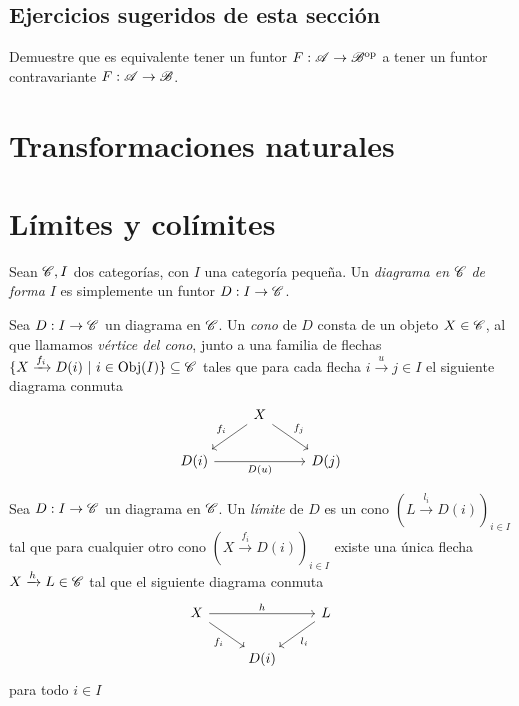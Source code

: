 \documentclass{comunicaciones}
\begin{document}
\subsection{Ejercicios sugeridos de esta sección}

\begin{ex}
    Demuestre que es equivalente tener un funtor $F:\mathscr A\to\mathscr B^{\mathrm{op}}$ a tener un funtor contravariante $F:\mathscr A\to\mathscr B$.
\end{ex}

\section{Transformaciones naturales}



\section{Límites y colímites}

\begin{dfn}[Diagrama]
    Sean $\mathscr C,I$ dos categorías, con $I$ una categoría pequeña. Un \emph{diagrama en} $\mathscr C$ \emph{de forma} $I$ es simplemente un funtor $D:I\to\mathscr C$.   
\end{dfn}

\begin{dfn}
    Sea $D:I\to\mathscr C$ un diagrama en $\mathscr C$. Un \emph{cono} de $D$ consta de un objeto $X\in\mathscr C$, al que llamamos \emph{vértice del cono}, junto a una familia
    de flechas $\{X\xrightarrow{f_i}D(i) \ |\ i\in\Obj(I)\}\subseteq\C$ tales que para cada flecha $i\xrightarrow{u}j\in I$ el siguiente diagrama conmuta
    \[\begin{tikzcd}
        & X \\
        {D(i)} && {D(j)}
        \arrow["{f_i}"', from=1-2, to=2-1]
        \arrow["{f_j}", from=1-2, to=2-3]
        \arrow["{D(u)}"', from=2-1, to=2-3]
    \end{tikzcd}\]
\end{dfn}

\begin{dfn}
    Sea $D:I\to\mathscr C$ un diagrama en $\mathscr C$. Un \emph{límite} de $D$ es un cono $(L\xrightarrow{l_i}D(i))_{i\in I}$ tal que para cualquier otro cono $(X\xrightarrow{f_i}D(i))_{i\in I}$
    existe una única flecha $X\xrightarrow{h}L\in\mathscr C$ tal que el siguiente diagrama conmuta
    \[\begin{tikzcd}
        X && L \\
        & {D(i)}
        \arrow["h", from=1-1, to=1-3]
        \arrow["{f_i}"', from=1-1, to=2-2]
        \arrow["{l_i}", from=1-3, to=2-2]
    \end{tikzcd}\] para todo $i\in I$
\end{dfn}
\end{document}
